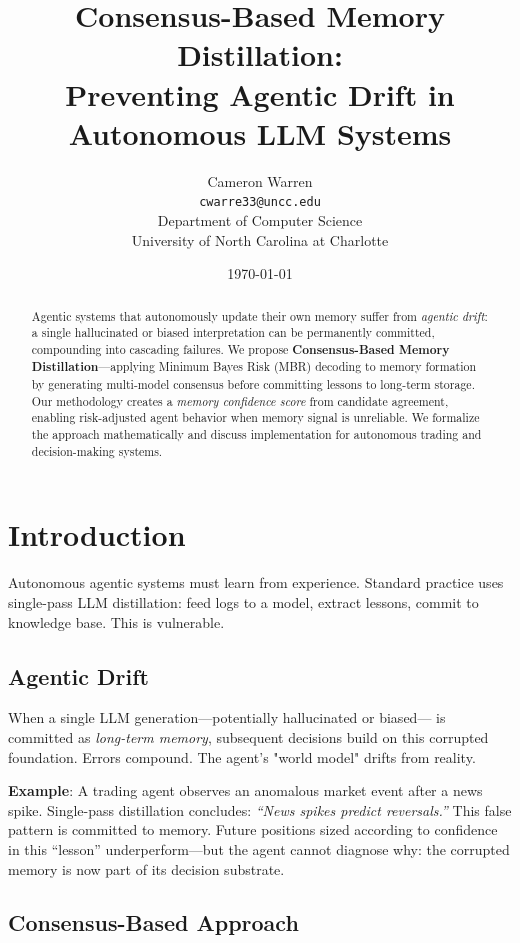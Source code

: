 \documentclass[11pt,a4paper]{article}
\title{Consensus-Based Memory Distillation: \\[0.3em]
       Preventing Agentic Drift in Autonomous LLM Systems}
\author{Cameron Warren\\
  \texttt{cwarre33@uncc.edu}\\[0.5em]
  Department of Computer Science\\
  University of North Carolina at Charlotte
}
\date{\today}
\begin{document}
\maketitle

\begin{abstract}
Agentic systems that autonomously update their own memory suffer from 
\emph{agentic drift}: a single hallucinated or biased interpretation
can be permanently committed, compounding into cascading failures. 
We propose \textbf{Consensus-Based Memory Distillation}---applying 
Minimum Bayes Risk (MBR) decoding to memory formation by generating 
multi-model consensus before committing lessons to long-term storage. 
Our methodology creates a \emph{memory confidence score} from candidate 
agreement, enabling risk-adjusted agent behavior when memory signal 
is unreliable. We formalize the approach mathematically and discuss 
implementation for autonomous trading and decision-making systems.
\end{abstract}

\section{Introduction}

Autonomous agentic systems must learn from experience. Standard practice 
uses single-pass LLM distillation: feed logs to a model, extract lessons, 
commit to knowledge base. This is vulnerable.

\subsection{Agentic Drift}

When a single LLM generation---potentially hallucinated or biased---
is committed as \emph{long-term memory}, subsequent decisions build 
on this corrupted foundation. Errors compound. The agent's "world 
model" drifts from reality.

\textbf{Example}: A trading agent observes an anomalous market event 
after a news spike. Single-pass distillation concludes: \emph{``News 
spikes predict reversals.''} This false pattern is committed to memory. 
Future positions sized according to confidence in this ``lesson'' 
underperform---but the agent cannot diagnose why: the corrupted memory 
is now part of its decision substrate.

\subsection{Consensus-Based Approach}
\end{document}
